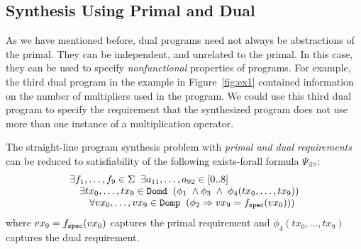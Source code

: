 \documentclass[preprint]{sig-alternate-05-2015}
\def\domp{{\tt{Domp}}}
\def\domd{{\tt{Domd}}}
\def\spec{{\tt{spec}}}
\def\Sig{{\Sigma}}
\begin{document}
\subsection{Synthesis Using Primal and Dual}

As we have mentioned before, dual programs need not always be
abstractions of the primal. They can be independent, and unrelated
to the primal. In this case, they can be used to specify
{\em{nonfunctional}} properties of programs.
For example, the third dual program in the example in Figure~\ref{fig:ex1}
contained information on the number of multipliers used in the program.
We could use this third dual program to specify the requirement
that the synthesized program does not use more than
one instance of a multiplication operator.

The straight-line program synthesis problem with
{\em{primal and dual requirements}} can be reduced to
satisfiability of
the following exists-forall formula $\Psi_{\exists\forall}$:
\[
  \begin{array}{l}
  \exists{f_1,\ldots,f_9}\in\Sig\;\;
  \exists{a_{11},\ldots,a_{92}}\in [0..8]\;\;
  \\ \quad
  \exists{tx_0,\ldots,tx_9}\in\domd\;\;
  (\phi_1 \; \wedge
  \phi_3 \;\wedge\; \phi_4(tx_0,\ldots,tx_9))
  \\ \qquad
  \forall{vx_0,\ldots,vx_9}\in\domp\;\;(\phi_2 \Rightarrow vx_9 = f_\spec(vx_0)))
\end{array}
\]
where $vx_9 = f_\spec(vx_0)$ captures the primal requirement and
$\phi_4(tx_0,\ldots,tx_9)$ captures the dual requirement.
\end{document}
